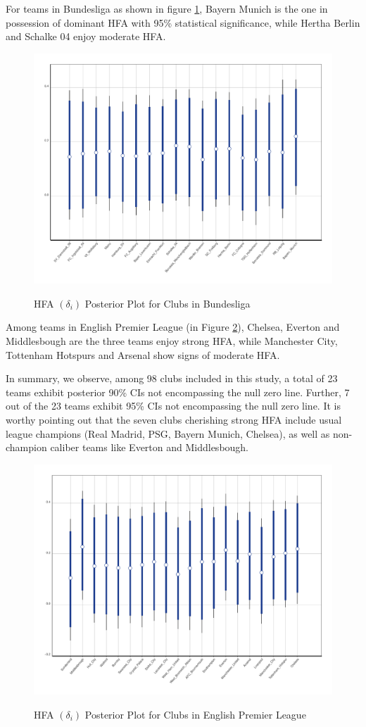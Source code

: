 \documentclass[]{interact}
\theoremstyle{plain}%
\theoremstyle{definition}
\theoremstyle{remark}
\begin{document}
For teams in Bundesliga as shown in figure \ref{fig5}, Bayern Munich is the one in possession of dominant HFA with 95\% statistical significance, while Hertha Berlin and Schalke 04 enjoy moderate HFA.  

\begin{figure}
	{\includegraphics[width=0.9\linewidth]{HFA_Posterior_Bundesliga.pdf}}
	\caption{HFA $(\delta_i)$ Posterior Plot for Clubs in Bundesliga}	
	\label{fig5}
\end{figure}

Among teams in English Premier League (in Figure \ref{fig6}), Chelsea, Everton and Middlesbough are the three teams enjoy strong HFA, while Manchester City, Tottenham Hotspurs and Arsenal show signs of moderate HFA. 

In summary, we observe, among 98 clubs included in this study, a total of 23 teams exhibit posterior 90\% CIs not encompassing the null zero line. Further, 7 out of the 23 teams exhibit 95\% CIs not encompassing the null zero line. It is worthy pointing out that the seven clubs cherishing strong HFA include usual league champions (Real Madrid, PSG, Bayern Munich, Chelsea), as well as non-champion caliber teams like Everton and Middlesbough.  

\begin{figure}
	{\includegraphics[width=0.9\linewidth]{HFA_Posterior_EPL.pdf}}
	\caption{HFA $(\delta_i)$ Posterior Plot for Clubs in English Premier League}	
	\label{fig6}
\end{figure}
\end{document}
